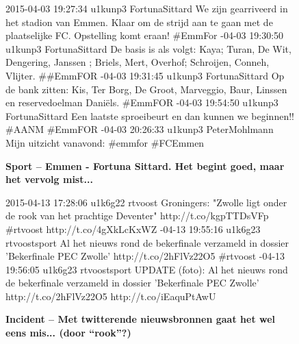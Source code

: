 {{\vspace*{-17pt} 
\begin{figure}[H]
 \caption{\bf{Sport} – Emmen - Fortuna Sittard. Het begint goed, maar het vervolg mist...}
\vspace*{-10pt} 
\begin{framed}
\footnotesize{
2015-04-03 19:27:34 u1kunp3 FortunaSittard We zijn gearriveerd in het stadion van Emmen. Klaar om de strijd aan te gaan met de plaatselijke FC. Opstelling komt eraan! \#EmmFor
-04-03 19:30:50 u1kunp3 FortunaSittard De basis is als volgt: Kaya; Turan, De Wit, Dengering, Janssen ; Briels, Mert, Overhof; Schroijen, Conneh, Vlijter. \#\#EmmFOR
-04-03 19:31:45 u1kunp3 FortunaSittard Op de bank zitten: Kis, Ter Borg, De Groot, Marveggio, Baur, Linssen en reservedoelman Daniëls. \#EmmFOR
-04-03 19:54:50 u1kunp3 FortunaSittard Een laatste sproeibeurt en dan kunnen we beginnen!! \#AANM \#EmmFOR
-04-03 20:26:33 u1kunp3 PeterMohlmann Mijn uitzicht vanavond: \#emmfor \#FCEmmen
}
\end{framed}
\end{figure}


\vspace*{-17pt} 
\begin{figure}[H]
 \caption{\bf{Incident} – Met twitterende nieuwsbronnen gaat het wel eens mis... (door ``rook''?)}
\vspace*{-10pt} 
\begin{framed}
\footnotesize{
2015-04-13 17:28:06 u1k6g22 rtvoost Groningers: "Zwolle ligt onder de rook van het prachtige Deventer" http://t.co/kgpTTDsVFp \#rtvoost http://t.co/4gXkLcKxWZ
-04-13 19:55:16 u1k6g23 rtvoostsport Al het nieuws rond de bekerfinale verzameld in dossier 'Bekerfinale PEC Zwolle' http://t.co/2hFlVz22O5 \#rtvoost
-04-13 19:56:05 u1k6g23 rtvoostsport UPDATE (foto): Al het nieuws rond de bekerfinale verzameld in dossier 'Bekerfinale PEC Zwolle' http://t.co/2hFlVz22O5 http://t.co/iEaquPtAwU
}
\end{framed}
\end{figure}

}}
